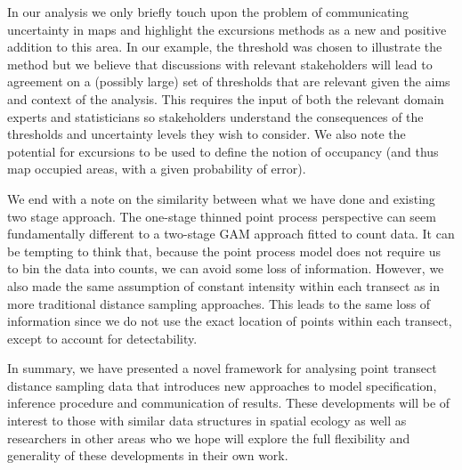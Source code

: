 \documentclass{stylefile16/statsoc}
\begin{document}
In our analysis we only briefly touch upon the problem of communicating uncertainty in maps and highlight the excursions methods as a new and positive addition to this area.  In our example, the threshold was chosen to illustrate the method but we believe that discussions with relevant stakeholders will lead to agreement on a (possibly large) set of thresholds that are relevant given the aims and context of the analysis.  This requires the input of both the relevant domain experts and statisticians so stakeholders understand the consequences of the thresholds and uncertainty levels they wish to consider.  We also note the potential for excursions to be used to define the notion of occupancy (and thus map occupied areas, with a given probability of error).

We end with a note on the similarity between what we have done and existing two stage approach.  The one-stage thinned point process perspective can seem fundamentally different to a two-stage GAM approach fitted to count data.  It can be tempting to think that, because the point process model does not require us to bin the data into counts, we can avoid some loss of information.  However, we also made the same assumption of constant intensity within each transect as in more traditional distance sampling approaches.  This leads to the same loss of information since we do not use the exact location of points within each transect, except to account for detectability.

In summary, we have presented a novel framework for analysing point transect distance sampling data that introduces new approaches to model specification, inference procedure and communication of results.  These developments will be of interest to those with similar data structures in spatial ecology as well as researchers in other areas who we hope will explore the full flexibility and generality of these developments in their own work.


\clearpage


\end{document}
